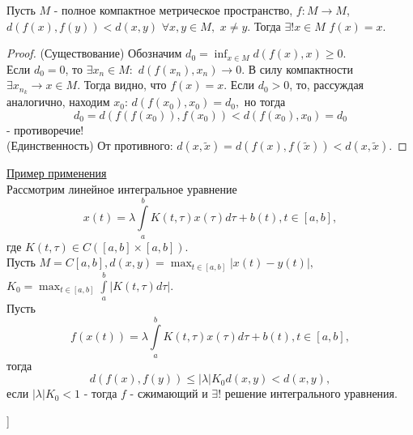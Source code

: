 \begin{theorem}
Пусть $M$ - полное компактное метрическое пространство, $f:M \rightarrow M$, $d(f(x), f(y)) < d(x, y)$ $\forall x, y \in M,$ $x \neq y.$ Тогда $\exists!x \in M$ $f(x)=x$.
\end{theorem}
\begin{proof}
    (Существование) Обозначим $d_0=\inf_{x \in M}{d(f(x), x)} \geq 0.$ \\
    Если $d_0 = 0$, то $\exists x_n \in M:$ $d(f(x_n), x_n) \rightarrow 0.$ В силу компактности $\exists x_{n_k} \rightarrow x \in M$. Тогда видно, что $f(x)=x$.
    Если $d_0 > 0$, то, рассуждая аналогично, находим $x_0$: $d(f(x_0), x_0)=d_0,$ но тогда
    \begin{equation*}
        d_0 = d(f(f(x_0)), f(x_0)) < d(f(x_0), x_0) = d_0
    \end{equation*}
    - противоречие! \\
    (Единственность) От противного: $d(x, \tilde{x})=d(f(x),f(\tilde{x})) < d(x, \tilde{x}).$
\end{proof}

{\large \underline{Пример применения}} \\
Рассмотрим линейное интегральное уравнение
\begin{equation*}
    x(t) = \lambda \int\limits_a^b K(t, \tau)x(\tau)d\tau + b(t), t \in [a,b],
\end{equation*}
где $K(t, \tau) \in C([a,b] \times [a,b]).$ \\
Пусть $M=C[a,b], d(x,y) = \max_{t \in [a,b]}|x(t)-y(t)|,$ $ K_0 = \max_{t \in [a,b]} \int\limits_a^b|K(t,\tau)d\tau|.$ \\
Пусть
\begin{equation*}
    f(x(t)) = \lambda \int\limits_a^b K(t, \tau)x(\tau)d\tau + b(t), t \in [a,b],
\end{equation*}
тогда
\begin{equation*}
    d(f(x), f(y)) \leq |\lambda|K_0d(x,y) < d(x,y),
\end{equation*}
если $|\lambda|K_0 < 1$ - тогда $f$ - сжимающий и $\exists!$ решение интегрального уравнения.

\bigbreak
[\cite[page 49-52]{funcan_autumn}]
